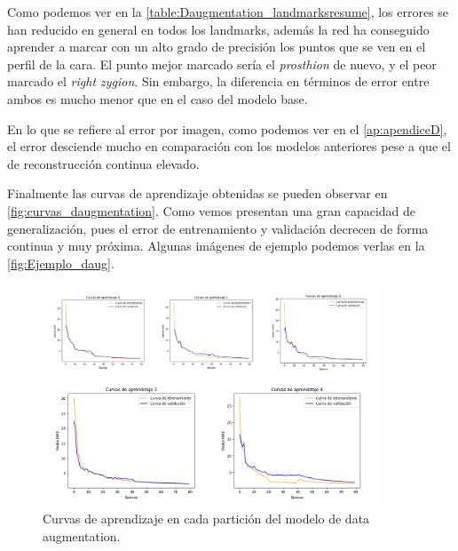         \noindent Como podemos ver en la \autoref{table:Daugmentation_landmarksresume}, los errores se han reducido en general en todos los landmarks, además la red ha conseguido aprender a marcar con un alto grado de precisión los puntos que se ven en el perfil de la cara. El punto mejor marcado sería el \textit{prosthion} de nuevo, y el peor marcado el \textit{right zygion}. Sin embargo, la diferencia en términos de error entre ambos es mucho menor que en el caso del modelo base. 

        \medskip

        \noindent En lo que se refiere al error por imagen, como podemos ver en el \autoref{ap:apendiceD}, el error desciende mucho en comparación con los modelos anteriores pese a que el de reconstrucción continua elevado.

        \medskip

        \noindent Finalmente las curvas de aprendizaje obtenidas se pueden observar en \autoref{fig:curvas_daugmentation}. Como vemos presentan una gran capacidad de generalización, pues el error de entrenamiento y validación decrecen de forma continua y muy próxima. Algunas imágenes de ejemplo podemos verlas en la \autoref{fig:Ejemplo_daug}.

        \begin{figure}[!h]
            \centering
            \includegraphics[width=0.9\textwidth]{img/curvas_daugmentation.png}
            \caption{Curvas de aprendizaje en cada partición del modelo de data augmentation.}
            \label{fig:curvas_daugmentation}
        \end{figure}

